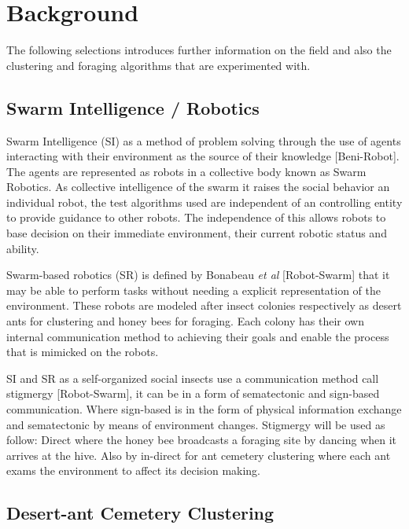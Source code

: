 \documentclass[12pt]{article}
\begin{document}
\section{Background}

The following selections introduces further information on the field and also the clustering and foraging algorithms that are experimented with.

\subsection{Swarm Intelligence / Robotics}

\par{Swarm Intelligence (SI) as a method of problem solving through the use of agents interacting with their environment as the source of their knowledge [Beni-Robot]. The agents are represented as robots in a collective body known as Swarm Robotics. As collective intelligence of the swarm it raises the social behavior an individual robot, the test algorithms used are independent of an controlling entity to provide guidance to other robots. The independence of this allows robots to base decision on their immediate environment, their current robotic status and ability.}
\\
\par{Swarm-based robotics (SR) is defined by Bonabeau \textit{et al} [Robot-Swarm] that it may be able to perform tasks without needing a explicit representation of the environment. These robots are modeled after insect colonies respectively as desert ants for clustering and honey bees for foraging. Each colony has their own internal communication method to achieving their goals and enable the process that is mimicked on the robots.}
\\
\par{SI and SR as a self-organized social insects use a communication method call stigmergy [Robot-Swarm], it can be in a form of sematectonic and sign-based communication. Where sign-based is in the form of physical information exchange and sematectonic by means of environment changes. Stigmergy will be used as follow: Direct where the honey bee broadcasts a foraging site by dancing when it arrives at the hive. Also by in-direct for ant cemetery clustering where each ant exams the environment to affect its decision making.}

\subsection{Desert-ant Cemetery Clustering}
\end{document}
